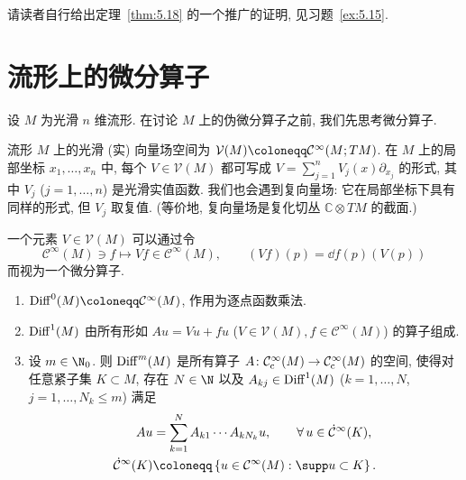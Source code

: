 请读者自行给出定理~\ref{thm:5.18} 的一个推广的证明, 见习题~\ref{ex:5.15}.

\section{流形上的微分算子}\label{sec:5.3}
%

设 $M$ 为光滑 $n$ 维流形. 在讨论 $M$ 上的伪微分算子之前, 我们先思考微分算子.

\begin{definition}[光滑向量场空间]\label{def:5.19}
流形 $M$ 上的光滑 (实) 向量场空间为 $\mathcal{V}(M) \defeq \mathcal{C}^\infty(M; TM)$. 在 $M$ 上的局部坐标 $x_1, \ldots, x_n$ 中, 每个 $V \in \mathcal{V}(M)$ 都可写成 $V = \sum_{j=1}^n V_j(x) \partial_{x_j}$ 的形式, 其中 $V_j$ ($j = 1, \ldots, n$) 是光滑实值函数. 我们也会遇到复向量场: 它在局部坐标下具有同样的形式, 但 $V_j$ 取复值. (等价地, 复向量场是复化切丛 $\mathbb{C} \otimes TM$ 的截面.)

一个元素 $V \in \mathcal{V}(M)$ 可以通过令
\begin{equation}\label{eq:5.46}
    \mathcal{C}^\infty(M) \ni f \mapsto V f \in \mathcal{C}^\infty(M), \qquad (V f)(p) = \dd f(p)(V(p))
\end{equation}
而视为一个微分算子.
\end{definition}

\begin{definition}[流形上的微分算子代数]\label{def:5.20}
\begin{enumerate}
    \item $\Diff^0(M) \defeq \mathcal{C}^\infty(M)$, 作用为逐点函数乘法.
    \item $\operatorname{Diff}^1(M)$ 由所有形如 $A u = V u + f u$ ($V \in \mathcal{V}(M), f \in \mathcal{C}^\infty(M)$) 的算子组成.
    \item 设 $m \in \N_0$. 则 $\operatorname{Diff}^m(M)$ 是所有算子 $A \colon \mathcal{C}_{\mathrm{c}}^\infty(M) \to \mathcal{C}_{\mathrm{c}}^\infty(M)$ 的空间, 使得对任意紧子集 $K \subset M$, 存在 $N \in \N$ 以及 $A_{kj} \in \operatorname{Diff}^1(M)$ ($k = 1, \ldots, N$, $j = 1, \ldots, N_k \le m$) 满足
    \begin{equation}\label{eq:5.47}
        \begin{aligned}
            A u &= \sum_{k=1}^N A_{k1} \cdots A_{kN_k} u, \qquad \forall\, u \in \dot{\mathcal{C}}^\infty(K), \\
            \dot{\mathcal{C}}^\infty(K) &\defeq \left\{ u \in \mathcal{C}^\infty(M) : \supp u \subset K \right\}.
        \end{aligned}
    \end{equation}
\end{enumerate}
\end{definition}

